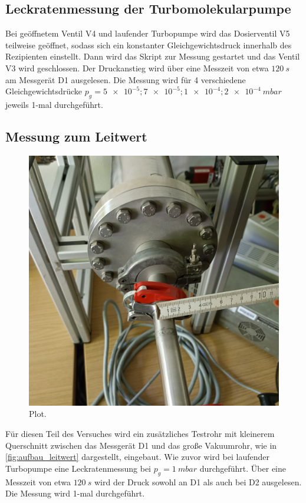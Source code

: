 \subsection{Leckratenmessung der Turbomolekularpumpe}
Bei geöffnetem Ventil V4 und laufender Turbopumpe wird das Dosierventil V5 teilweise geöffnet, sodass sich ein konstanter Gleichgewichtsdruck innerhalb des Rezipienten einstellt.
Dann wird das Skript zur Messung gestartet und das Ventil V3 wird geschlossen. Der Druckanstieg wird über eine Messzeit von etwa $\SI{120}{s}$ am Messgerät D1 ausgelesen.
Die Messung wird für 4 verschiedene Gleichgewichtsdrücke $p_{\mathit{g}} = \num{5e-5}; \num{7e-5}; \num{1e-4}; \SI{2e-4}{mbar}$ jeweils 1-mal durchgeführt.

\subsection{Messung zum Leitwert}
\begin{figure}
  \centering
  \includegraphics[width=0.7\linewidth]{assets/aufbau_leitwert}
  \caption{Plot.}
  \label{fig:plot}
\end{figure}
Für diesen Teil des Versuches wird ein zusätzliches Testrohr mit kleinerem Querschnitt zwischen das Messgerät D1 und das große Vakuumrohr, wie in \autoref{fig:aufbau_leitwert}
dargestellt, eingebaut. Wie zuvor wird bei laufender Turbopumpe eine Leckratenmessung bei $p_{\mathit{g}} = \SI{1}{mbar}$ durchgeführt. Über eine Messzeit von etwa $\SI{120}{s}$
wird der Druck sowohl an D1 als auch bei D2 ausgelesen. Die Messung wird 1-mal durchgeführt.